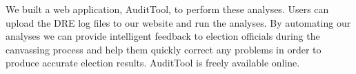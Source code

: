 \documentclass[letterpaper,twocolumn,10pt]{article}
\begin{document}
We built a web application, AuditTool, to perform these analyses. Users can
upload the DRE log files to our website and run the analyses. By automating our
analyses we can provide intelligent feedback to election officials during the
canvassing process and help them quickly correct any problems in order to
produce accurate election results. AuditTool is freely available online.  
 


{\footnotesize 
}


\end{document}
